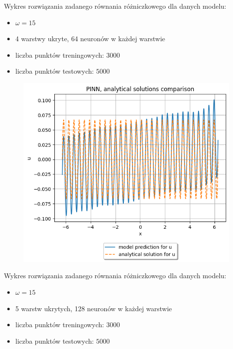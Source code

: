 \documentclass{article}
\begin{document}
Wykres rozwiązania zadanego równania różniczkowego dla danych modelu:\\
\begin{itemize}
  \item $\omega = 15$\\
  \item 4 warstwy ukryte, 64 neuronów w każdej warstwie\\
  \item liczba punktów treningowych: $3000$\\
  \item liczba punktów testowych: $5000$
\end{itemize}

\begin{figure}[H]
  \includegraphics[width=\linewidth]{figures/second2.png}
\end{figure}

Wykres rozwiązania zadanego równania różniczkowego dla danych modelu:\\
\begin{itemize}
  \item $\omega = 15$\\
  \item 5 warstw ukrytych, 128 neuronów w każdej warstwie\\
  \item liczba punktów treningowych: $3000$\\
  \item liczba punktów testowych: $5000$
\end{itemize}
\end{document}
